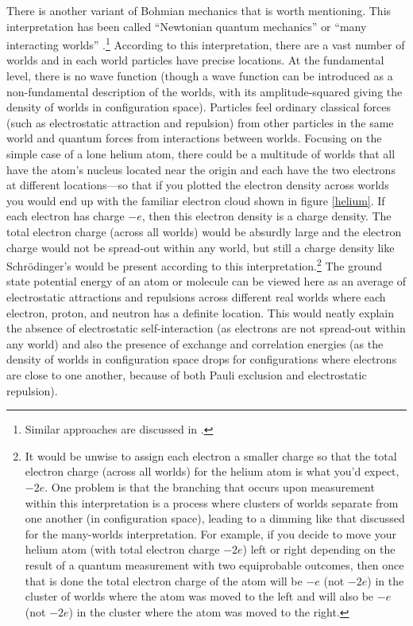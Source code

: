 \documentclass[onecolumn,secnumarabic,amsmath,amssymb,balancelastpage,nofootinbib]{article}
\begin{document}
There is another variant of Bohmian mechanics that is worth mentioning.  This interpretation has been called ``Newtonian quantum mechanics'' \cite{sebens2015} or ``many interacting worlds'' \cite{HDW}.\footnote{Similar approaches are discussed in \cite{holland2005, tipler2006, schiff2012, bostrom2015, bokulich2020}.}  According to this interpretation, there are a vast number of worlds and in each world particles have precise locations.  At the fundamental level, there is no wave function (though a wave function can be introduced as a non-fundamental description of the worlds, with its amplitude-squared giving the density of worlds in configuration space).  Particles feel ordinary classical forces (such as electrostatic attraction and repulsion) from other particles in the same world and quantum forces from interactions between worlds.  Focusing on the simple case of a lone helium atom, there could be a multitude of worlds that all have the atom's nucleus located near the origin and each have the two electrons at different locations---so that if you plotted the electron density across worlds you would end up with the familiar electron cloud shown in figure \ref{helium}.  If each electron has charge $-e$, then this electron density is a charge density.  The total electron charge (across all worlds) would be absurdly large and the electron charge would not be spread-out within any world, but still a charge density like Schr\"{o}dinger's would be present according to this interpretation.\footnote{It would be unwise to assign each electron a smaller charge so that the total electron charge (across all worlds) for the helium atom is what you'd expect, $-2e$.  One problem is that the branching that occurs upon measurement within this interpretation is a process where clusters of worlds separate from one another (in configuration space), leading to a dimming like that discussed for the many-worlds interpretation.  For example, if you decide to move your helium atom (with total electron charge $-2e$) left or right depending on the result of a quantum measurement with two equiprobable outcomes, then once that is done the total electron charge of the atom will be $-e$ (not $-2e$) in the cluster of worlds where the atom was moved to the left and will also be $-e$ (not $-2e$) in the cluster where the atom was moved to the right.}  The ground state potential energy of an atom or molecule can be viewed here as an average of electrostatic attractions and repulsions across different real worlds where each electron, proton, and neutron has a definite location.  This would neatly explain the absence of electrostatic self-interaction (as electrons are not spread-out within any world) and also the presence of exchange and correlation energies (as the density of worlds in configuration space drops for configurations where electrons are close to one another, because of both Pauli exclusion and electrostatic repulsion).
\end{document}

